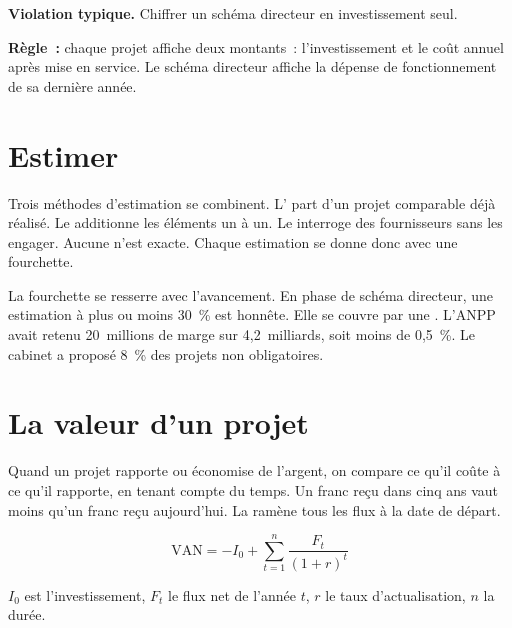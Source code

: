 \begin{boxalert}
\textbf{Violation typique.} Chiffrer un schéma directeur en investissement seul.

\smallskip
\textbf{Règle~:} chaque projet affiche deux montants~: l'investissement et le coût annuel après mise en
service. Le schéma directeur affiche la dépense de fonctionnement de sa dernière année.
\end{boxalert}

\section{Estimer}
\label{sec:c12-estimer}

Trois méthodes d'estimation se combinent. L' part d'un projet comparable déjà réalisé. Le
 additionne les éléments un à un. Le  interroge des fournisseurs sans
les engager. Aucune n'est exacte. Chaque estimation se donne donc avec une fourchette.

La fourchette se resserre avec l'avancement. En phase de schéma directeur, une estimation à plus ou moins
30~\% est honnête. Elle se couvre par une . L'ANPP avait retenu 20~millions de
marge sur 4,2~milliards, soit moins de 0,5~\%. Le cabinet a proposé 8~\% des projets non obligatoires.

\section{La valeur d'un projet}
\label{sec:c12-valeur}

Quand un projet rapporte ou économise de l'argent, on compare ce qu'il coûte à ce qu'il rapporte, en tenant
compte du temps. Un franc reçu dans cinq ans vaut moins qu'un franc reçu aujourd'hui. La
 ramène tous les flux à la date de départ.

\begin{equation}
    \mathrm{VAN} = -I_0 + \sum_{t=1}^{n} \frac{F_t}{(1+r)^t}
\end{equation}

$I_0$ est l'investissement, $F_t$ le flux net de l'année $t$, $r$ le taux d'actualisation, $n$ la durée.

